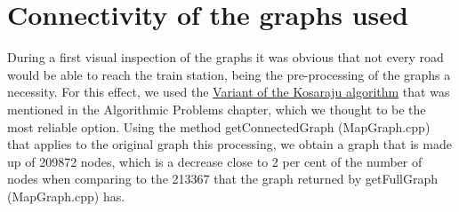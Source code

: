 \chapter{Connectivity of the graphs used} \label{connectivity-graphs}
During a first visual inspection of the graphs it was obvious that not every road  would be able to reach the train station, being the pre-processing of the graphs a necessity.
For this effect, we used the \hyperref[algorithm-scc-kosaraju-v]{Variant of the Kosaraju algorithm} that was mentioned in the Algorithmic Problems chapter, which we thought to be the most reliable option.
Using the method getConnectedGraph (MapGraph.cpp) that applies to the original graph this processing, we obtain a graph that is made up of 209872 nodes, which is a decrease close to 2 per cent of the number of nodes when comparing to the  213367 that the graph returned by getFullGraph (MapGraph.cpp) has.